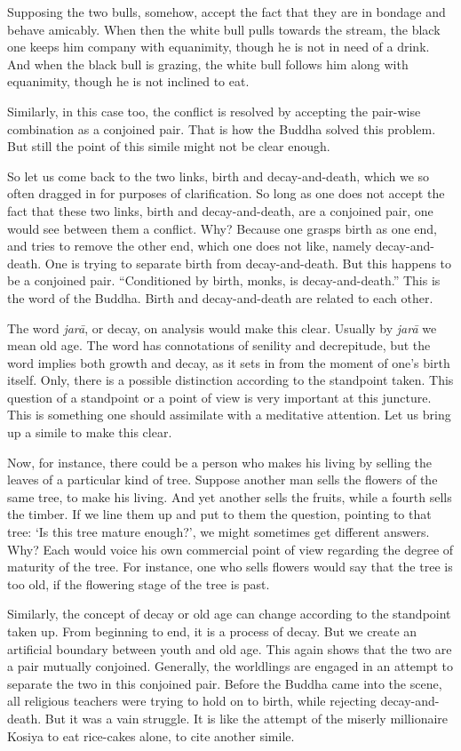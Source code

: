 Supposing the two bulls, somehow, accept the fact that they are in bondage and behave amicably. When then the white bull pulls towards the stream, the black one keeps him company with equanimity, though he is not in need of a drink. And when the black bull is grazing, the white bull follows him along with equanimity, though he is not inclined to eat.

Similarly, in this case too, the conflict is resolved by accepting the pair-wise combination as a conjoined pair. That is how the Buddha solved this problem. But still the point of this simile might not be clear enough.

So let us come back to the two links, birth and decay-and-death, which we so often dragged in for purposes of clarification. So long as one does not accept the fact that these two links, birth and decay-and-death, are a conjoined pair, one would see between them a conflict. Why? Because one grasps birth as one end, and tries to remove the other end, which one does not like, namely decay-and-death. One is trying to separate birth from decay-and-death. But this happens to be a conjoined pair. ``Conditioned by birth, monks, is decay-and-death.'' This is the word of the Buddha. Birth and decay-and-death are related to each other.

The word \emph{jarā}, or decay, on analysis would make this clear. Usually by \emph{jarā} we mean old age. The word has connotations of senility and decrepitude, but the word implies both growth and decay, as it sets in from the moment of one's birth itself. Only, there is a possible distinction according to the standpoint taken. This question of a standpoint or a point of view is very important at this juncture. This is something one should assimilate with a meditative attention. Let us bring up a simile to make this clear.

Now, for instance, there could be a person who makes his living by selling the leaves of a particular kind of tree. Suppose another man sells the flowers of the same tree, to make his living. And yet another sells the fruits, while a fourth sells the timber. If we line them up and put to them the question, pointing to that tree: `Is this tree mature enough?', we might sometimes get different answers. Why? Each would voice his own commercial point of view regarding the degree of maturity of the tree. For instance, one who sells flowers would say that the tree is too old, if the flowering stage of the tree is past.

Similarly, the concept of decay or old age can change according to the standpoint taken up. From beginning to end, it is a process of decay. But we create an artificial boundary between youth and old age. This again shows that the two are a pair mutually conjoined. Generally, the worldlings are engaged in an attempt to separate the two in this conjoined pair. Before the Buddha came into the scene, all religious teachers were trying to hold on to birth, while rejecting decay-and-death. But it was a vain struggle. It is like the attempt of the miserly millionaire Kosiya to eat rice-cakes alone, to cite another simile.

